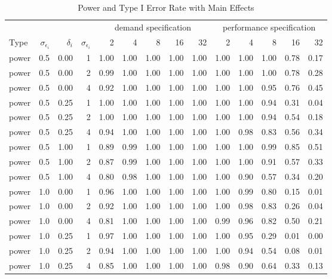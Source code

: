 \begin{table}

\caption{\label{tab:big-main-table}Power and Type I Error Rate with Main Effects}
\centering
\fontsize{8}{10}\selectfont
\begin{tabular}[t]{lrrrrrrrrrrrrr}
\toprule
\multicolumn{4}{c}{ } & \multicolumn{5}{c}{demand specification} & \multicolumn{5}{c}{performance specification} \\
\cmidrule(l{3pt}r{3pt}){5-9} \cmidrule(l{3pt}r{3pt}){10-14}
Type & $\sigma_{\epsilon_i}$ & $\delta_i$ & $\sigma_{\epsilon_i}$ & 2 & 4 & 8 & 16 & 32 & 2 & 4 & 8 & 16 & 32\\
\midrule
power & 0.5 & 0.00 & 1 & 1.00 & 1.00 & 1.00 & 1.00 & 1.00 & 1.00 & 1.00 & 1.00 & 0.78 & 0.17\\
power & 0.5 & 0.00 & 2 & 0.99 & 1.00 & 1.00 & 1.00 & 1.00 & 1.00 & 1.00 & 1.00 & 0.78 & 0.28\\
power & 0.5 & 0.00 & 4 & 0.92 & 1.00 & 1.00 & 1.00 & 1.00 & 1.00 & 1.00 & 0.95 & 0.76 & 0.45\\
power & 0.5 & 0.25 & 1 & 1.00 & 1.00 & 1.00 & 1.00 & 1.00 & 1.00 & 1.00 & 0.94 & 0.31 & 0.04\\
power & 0.5 & 0.25 & 2 & 1.00 & 1.00 & 1.00 & 1.00 & 1.00 & 1.00 & 1.00 & 0.94 & 0.54 & 0.18\\
power & 0.5 & 0.25 & 4 & 0.94 & 1.00 & 1.00 & 1.00 & 1.00 & 1.00 & 0.98 & 0.83 & 0.56 & 0.34\\
power & 0.5 & 1.00 & 1 & 0.89 & 0.99 & 1.00 & 1.00 & 1.00 & 1.00 & 1.00 & 0.99 & 0.85 & 0.51\\
power & 0.5 & 1.00 & 2 & 0.87 & 0.99 & 1.00 & 1.00 & 1.00 & 1.00 & 1.00 & 0.91 & 0.57 & 0.33\\
power & 0.5 & 1.00 & 4 & 0.80 & 0.98 & 1.00 & 1.00 & 1.00 & 1.00 & 0.90 & 0.57 & 0.34 & 0.20\\
power & 1.0 & 0.00 & 1 & 0.96 & 1.00 & 1.00 & 1.00 & 1.00 & 1.00 & 0.99 & 0.80 & 0.15 & 0.01\\
power & 1.0 & 0.00 & 2 & 0.92 & 1.00 & 1.00 & 1.00 & 1.00 & 1.00 & 0.98 & 0.83 & 0.26 & 0.04\\
power & 1.0 & 0.00 & 4 & 0.81 & 1.00 & 1.00 & 1.00 & 1.00 & 0.99 & 0.96 & 0.82 & 0.50 & 0.21\\
power & 1.0 & 0.25 & 1 & 0.97 & 1.00 & 1.00 & 1.00 & 1.00 & 1.00 & 0.95 & 0.29 & 0.01 & 0.00\\
power & 1.0 & 0.25 & 2 & 0.94 & 1.00 & 1.00 & 1.00 & 1.00 & 1.00 & 0.94 & 0.54 & 0.08 & 0.01\\
power & 1.0 & 0.25 & 4 & 0.85 & 1.00 & 1.00 & 1.00 & 1.00 & 0.98 & 0.90 & 0.64 & 0.33 & 0.13\\

\end{tabular}
\end{table}
